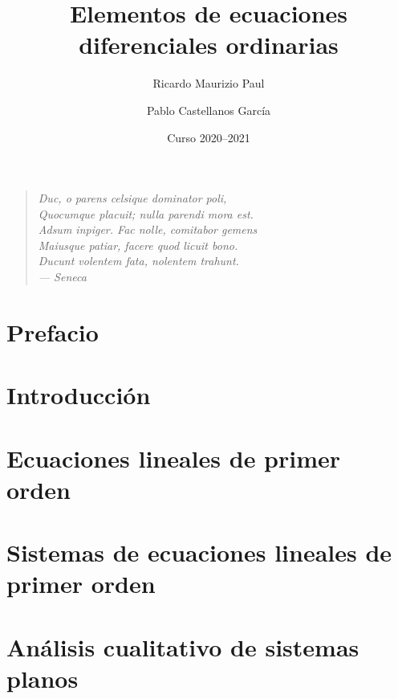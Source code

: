 \documentclass[draft, a4paper, 10pt, openany]{book}
\title{Elementos de ecuaciones diferenciales ordinarias}
\author{Ricardo Maurizio Paul \and Pablo Castellanos García}
\date{Curso 2020--2021}
\makeatletter
\renewcommand\mainmatter{
    \@mainmattertrue\cleardoublepage\renewcommand\thepage{\arabic{page}}}
\makeatother
\begin{document}
\frontmatter

\maketitle

\clearpage
\vspace*{\fill}
\thispagestyle{empty} %
\begin{quotation}
\raggedleft
\em %
Duc, o parens celsique dominator poli, \\
Quocumque placuit; nulla parendi mora est. \\
Adsum inpiger. Fac nolle, comitabor gemens \\
Maiusque patiar, facere quod licuit bono. \\
Ducunt volentem fata, nolentem trahunt. \\
\bigskip
--- Seneca
\end{quotation}
\vspace*{\fill}

\tableofcontents

\chapter{Prefacio}


\mainmatter


\chapter{Introducción}
\label{CHAP:INTRO}


\chapter{Ecuaciones lineales de primer orden}
\label{CHAP:ORDEN1}


\chapter{Sistemas de ecuaciones lineales de primer orden}
\label{CHAP:SISTEMAS}


\chapter{Análisis cualitativo de sistemas planos}
\label{CHAP:CUALITATIVO}

\end{document}
